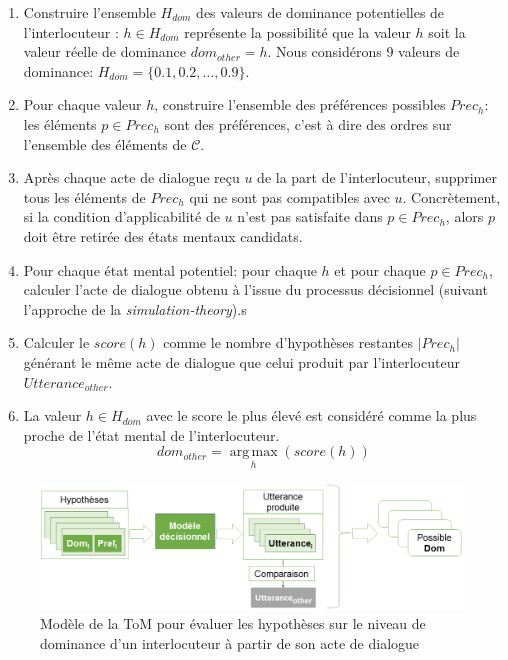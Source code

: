 \begin{enumerate}
	\item Construire l'ensemble $H_{dom}$ des  valeurs de dominance potentielles de l'interlocuteur : $h\in H_{dom}$ représente la possibilité que la valeur $h$ soit la valeur réelle de dominance $dom_{other}=h$. Nous considérons 9 valeurs de dominance: $H_{dom}=\{0.1, 0.2, \ldots, 0.9\}$.
	
	\item Pour chaque valeur $h$, construire l'ensemble des préférences possibles $Prec_h$: les éléments $p\in Prec_h$ sont des préférences, c'est à dire des ordres sur l'ensemble des éléments de $\mathcal{C}$.
	
	\item Après chaque acte de dialogue reçu $u$ de la part de l'interlocuteur, supprimer tous les éléments de $Prec_h$ qui ne sont pas compatibles avec $u$. Concrètement, si la condition d'applicabilité de $u$ n'est pas satisfaite dans $p \in Prec_h$, alors $p$ doit être retirée des états mentaux candidats.
	\item Pour chaque état mental potentiel: pour chaque $h$ et pour chaque $p \in  Prec_h$,  calculer l'acte de dialogue obtenu à l'issue du processus décisionnel (suivant l'approche de la \emph{simulation-theory}).s
	\item Calculer le $score(h)$ comme le nombre d'hypothèses restantes $|Prec_h|$ générant le même acte de dialogue que celui produit par l'interlocuteur $Utterance_{other}$. 
	\item 	La valeur $h \in H_{dom}$ avec le score le plus élevé est considéré comme la plus proche de l'état mental de l'interlocuteur.
	$$dom_{other} = \operatorname*{arg\,max}_{h} (score(h))$$
\end{enumerate}

	\begin{figure}
		\centering
		\includegraphics[width=\linewidth]{Figures/chap5/model/tom_select.PNG}
		\caption{Modèle de la ToM pour évaluer les hypothèses sur le niveau de dominance d'un interlocuteur à partir de son acte de dialogue} 
		\label{fig:tom}
	\end{figure} 
	
